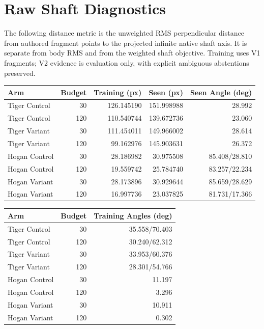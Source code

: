 \documentclass[11pt,letterpaper]{article}
\begin{document}
\section{Raw Shaft Diagnostics}
The following distance metric is the unweighted RMS perpendicular distance from authored fragment points to the projected infinite native shaft axis. It is separate from body RMS and from the weighted shaft objective. Training uses V1 fragments; V2 evidence is evaluation only, with explicit ambiguous abstentions preserved.
\begin{center}\small
\begin{tabular}{@{}lrrrr@{}}\toprule
Arm & Budget & Training (px) & Seen (px) & Seen Angle (deg)\\\midrule
Tiger Control & 30 & 126.145190 & 151.998988 & 28.992\\
Tiger Control & 120 & 110.540744 & 139.672736 & 23.060\\
Tiger Variant & 30 & 111.454011 & 149.966002 & 28.614\\
Tiger Variant & 120 & 99.162976 & 145.903631 & 26.372\\
Hogan Control & 30 & 28.186982 & 30.975508 & 85.408/28.810\\
Hogan Control & 120 & 19.559742 & 25.784740 & 83.257/22.234\\
Hogan Variant & 30 & 28.173896 & 30.929644 & 85.659/28.629\\
Hogan Variant & 120 & 16.997736 & 23.037825 & 81.731/17.366\\
\bottomrule\end{tabular}
\end{center}

\smallskip
\begin{center}\small
\begin{tabular}{@{}lrr@{}}\toprule
Arm & Budget & Training Angles (deg)\\\midrule
Tiger Control & 30 & 35.558/70.403\\
Tiger Control & 120 & 30.240/62.312\\
Tiger Variant & 30 & 33.953/60.376\\
Tiger Variant & 120 & 28.301/54.766\\
Hogan Control & 30 & 11.197\\
Hogan Control & 120 & 3.296\\
Hogan Variant & 30 & 10.911\\
Hogan Variant & 120 & 0.302\\
\bottomrule\end{tabular}
\end{center}
\end{document}
